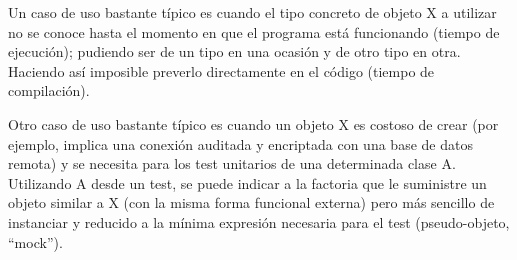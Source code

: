 \documentclass[spanish,12pt,a4paper,final,oneside]{book}
\begin{document}
Un caso de uso bastante típico es cuando el tipo concreto de objeto X a utilizar no se conoce hasta el momento en que el programa está funcionando (tiempo de ejecución); pudiendo ser de un tipo en una ocasión y de otro tipo en otra. Haciendo así imposible preverlo directamente en el código (tiempo de compilación).

Otro caso de uso bastante típico es cuando un objeto X es costoso de crear (por ejemplo, implica una conexión auditada y encriptada con una base de datos remota) y se necesita para los test unitarios de una determinada clase A. Utilizando A desde un test, se puede indicar a la factoria que le suministre un objeto similar a X (con la misma forma funcional externa) pero más sencillo de instanciar y reducido a la mínima expresión necesaria para el test (pseudo-objeto, ``mock'').
\end{document}
